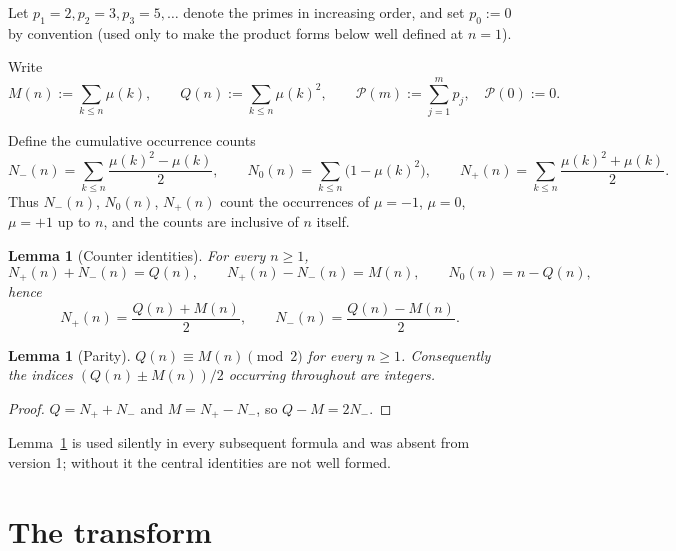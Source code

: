 \documentclass[11pt]{amsart}
\numberwithin{equation}{section}
\theoremstyle{plain}
\newtheorem{lemma}[theorem]{Lemma}
\theoremstyle{definition}
\theoremstyle{remark}
\newcommand{\mob}{\mu}
\newcommand{\Mert}{M}
\newcommand{\Sq}{Q}
\newcommand{\PS}{\mathcal P}
\begin{document}
Let $p_1=2,p_2=3,p_3=5,\ldots$ denote the primes in increasing order, and set
$p_0:=0$ by convention (used only to make the product forms below well defined
at $n=1$).

Write
\begin{equation}
\label{eq:basic-definitions}
\Mert(n):=\sum_{k\le n}\mob(k),
\qquad
\Sq(n):=\sum_{k\le n}\mob(k)^2 ,
\qquad
\PS(m):=\sum_{j=1}^{m}p_j ,\quad \PS(0):=0 .
\end{equation}

Define the cumulative occurrence counts
\begin{equation}
\label{eq:occurrence-counts}
N_-(n)=\sum_{k\le n}\frac{\mob(k)^2-\mob(k)}2,
\qquad
N_0(n)=\sum_{k\le n}\bigl(1-\mob(k)^2\bigr),
\qquad
N_+(n)=\sum_{k\le n}\frac{\mob(k)^2+\mob(k)}2 .
\end{equation}
Thus $N_-(n)$, $N_0(n)$, $N_+(n)$ count the occurrences of $\mob=-1$, $\mob=0$,
$\mob=+1$ up to $n$, and the counts are inclusive of $n$ itself.

\begin{lemma}[Counter identities]\label{lem:counters}
For every $n\ge1$,
\begin{equation}
\label{eq:counter-identities}
N_+(n)+N_-(n)=\Sq(n),
\qquad
N_+(n)-N_-(n)=\Mert(n),
\qquad
N_0(n)=n-\Sq(n),
\end{equation}
hence
\begin{equation}
\label{eq:counter-solutions}
N_+(n)=\frac{\Sq(n)+\Mert(n)}2,
\qquad
N_-(n)=\frac{\Sq(n)-\Mert(n)}2 .
\end{equation}
\end{lemma}

\begin{lemma}[Parity]\label{lem:parity}
$\Sq(n)\equiv \Mert(n)\pmod 2$ for every $n\ge1$. Consequently the indices
$(\Sq(n)\pm\Mert(n))/2$ occurring throughout are integers.
\end{lemma}

\begin{proof}
$\Sq=N_++N_-$ and $\Mert=N_+-N_-$, so $\Sq-\Mert=2N_-$.
\end{proof}

Lemma~\ref{lem:parity} is used silently in every subsequent formula and was
absent from version 1; without it the central identities are not well formed.

\section{The transform}
\label{sec:transform}
\end{document}
